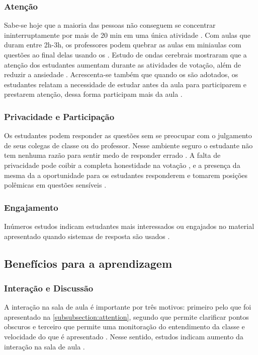 \subsubsection{Atenção}\label{subsubsection:attention}
Sabe-se hoje que a maioria das pessoas não conseguem se concentrar ininterruptamente
por mais de 20 min em uma única atividade \cite{Caldwell2007, DInverno2003}. Com aulas que
duram entre 2h-3h, os professores podem quebrar as aulas em miniaulas
com questões ao final delas usando os {\clickers} \cite{Hunsu2016}. Estudo de
ondas cerebrais mostraram que a atenção dos estudantes aumentam durante as
atividades de votação, além de reduzir a ansiedade \cite{Sun2014}. Acrescenta-se
também que quando os {\clickers} são adotados, os estudantes relatam a necessidade
de estudar antes da aula para participarem e prestarem atenção, dessa forma participam mais da aula \cite{Terrion2012}.

\subsubsection{Privacidade e Participação}\label{subsubsection:privacy}
Os estudantes podem responder as questões sem se preocupar com o julgamento
de seus colegas de classe ou do professor. Nesse ambiente seguro o estudante
não tem nenhuma razão para sentir medo de responder errado \cite{Schmidt2011}.
 A falta de privacidade pode coibir
a completa honestidade na votação \cite{Caldwell2007}, e a presença da mesma da a oportunidade
para os estudantes responderem e tomarem posições polêmicas em questões sensíveis \cite{Rana2016}.

\subsubsection{Engajamento}
Inúmeros estudos indicam estudantes mais interessados ou engajados no material
apresentado quando sistemas de resposta são usados
\cite{Kaya2016, Rana2016, Horne2015, Mattos2015, Moratelli2014, Kulatunga2014, Blood2013, Terrion2012,
Caldwell2007}.

\subsection{Benefícios para a aprendizagem}

\subsubsection{Interação e Discussão}
A interação na sala de aula é importante por três motivos: primeiro pelo que foi
apresentado na \autoref{subsubsection:attention}, segundo que permite clarificar
pontos obscuros e terceiro que permite uma monitoração do entendimento da classe
e velocidade do que é apresentado \cite{DInverno2003}. Nesse sentido, estudos
indicam aumento da interação na sala de aula \cite{Mattos2015, Barragues2011, Titman2011, Mayer2009, Caldwell2007}.

